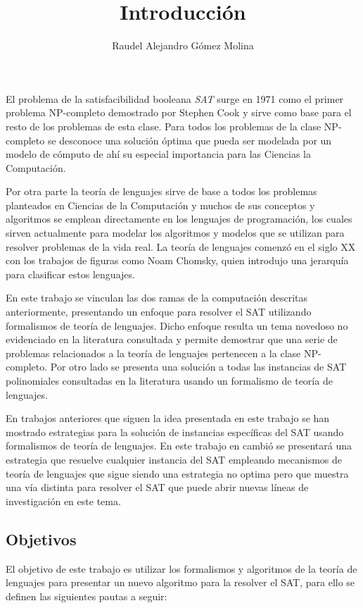 \documentclass[12pt]{article}
\title{Introducción}
\author{Raudel Alejandro Gómez Molina}
\begin{document}
\maketitle

El problema de la satisfacibilidad booleana \textit{SAT} surge en 1971 como el primer problema NP-completo demostrado por
Stephen Cook y sirve como base para el resto de los problemas de esta clase. Para todos los problemas de la clase NP-completo
se desconoce una solución óptima que pueda ser modelada por un modelo de cómputo de ahí su especial importancia para las Ciencias
la Computación.

Por otra parte la teoría de lenguajes sirve de base a todos los problemas planteados en Ciencias de la Computación y muchos
de sus conceptos y algoritmos se emplean directamente en los lenguajes de programación, los cuales sirven actualmente
para modelar los algoritmos y modelos que se utilizan para resolver problemas de la vida real. La teoría de lenguajes comenzó
en el siglo XX con los trabajos de figuras como Noam Chomsky, quien introdujo una jerarquía para clasificar estos lenguajes.

En este trabajo se vinculan las dos ramas de la computación descritas anteriormente, presentando un enfoque para resolver el SAT
utilizando formalismos de teoría de lenguajes. Dicho enfoque resulta un tema novedoso no evidenciado en la literatura consultada
y permite demostrar que una serie de problemas relacionados a la teoría de lenguajes pertenecen a la clase NP-completo. Por otro lado
se presenta una solución a todas las instancias de SAT polinomiales consultadas en la literatura usando un formalismo de teoría de
lenguajes.

En trabajos anteriores que siguen la idea presentada en este trabajo se han mostrado estrategias para la solución de instancias
específicas del SAT usando formalismos de teoría de lenguajes. En este trabajo en cambió se presentará una estrategia que resuelve
cualquier instancia del SAT empleando mecanismos de teoría de lenguajes que sigue siendo una estrategia no optima pero que muestra
una vía distinta para resolver el SAT que puede abrir nuevas líneas de investigación en este tema.

\subsection{Objetivos}

El objetivo de este trabajo es utilizar los formalismos y algoritmos de la teoría de lenguajes para presentar un nuevo algoritmo
para la resolver el SAT, para ello se definen las siguientes pautas a seguir:
\end{document}
